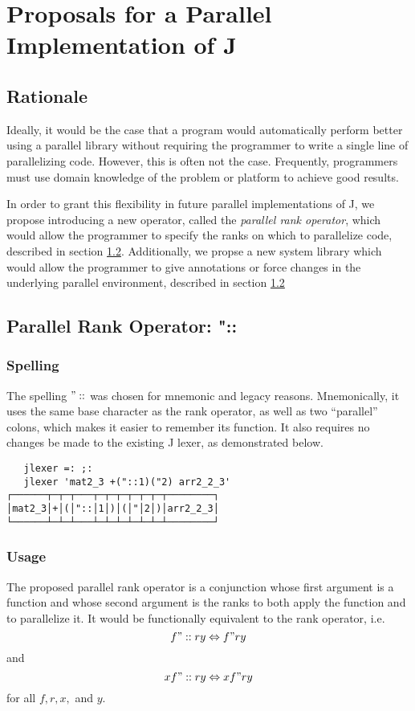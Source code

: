 \chapter{Proposals for a Parallel Implementation of J} %
\label{paraop}

\section{Rationale}
Ideally, it would be the case that a program would automatically perform better using a parallel library 
without requiring the programmer to write a single line of parallelizing code. 
However, this is often not the case. %
Frequently, programmers must use domain knowledge of the problem or platform to achieve good results. 

In order to grant this flexibility in future parallel implementations of J, 
we propose introducing a new operator, called the \textit{parallel rank operator}, 
which would allow the programmer to specify the ranks on which to parallelize code, 
described in section \ref{prank}.
Additionally, we propse a new system library
which would allow the programmer to give annotations or force changes in the underlying parallel environment,
described in section \ref{prank}

\section{Parallel Rank Operator: "::}
\label{prank}

\subsection{Spelling}
The spelling $"::$ was chosen for mnemonic and legacy reasons. 
Mnemonically, it uses the same base character as the rank operator, 
as well as two ``parallel'' colons, which makes it easier to remember its function.
It also requires no changes be made to the existing J lexer\cite{ioj}, 
as demonstrated below.

\begin{verbatim}
   jlexer =: ;:
   jlexer 'mat2_3 +("::1)("2) arr2_2_3'
┌──────┬─┬─┬───┬─┬─┬─┬─┬─┬─┬────────┐
│mat2_3│+│(│"::│1│)│(│"│2│)│arr2_2_3│
└──────┴─┴─┴───┴─┴─┴─┴─┴─┴─┴────────┘
\end{verbatim}

\subsection{Usage}
The proposed parallel rank operator is a conjunction 
whose first argument is a function 
and whose second argument is the ranks to both apply the function and to parallelize it. 
It would be functionally equivalent to the rank operator, i.e. 
\[f"::r y \Leftrightarrow f"r y\] and \[x f"::r y \Leftrightarrow x f"r y\] for all $f, r, x,$ and $y$.

